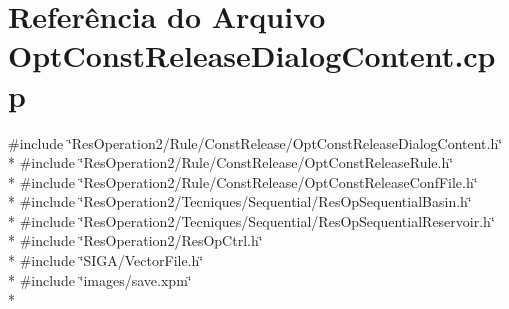 \section{Referência do Arquivo Opt\+Const\+Release\+Dialog\+Content.\+cpp}
\label{_opt_const_release_dialog_content_8cpp}
{\ttfamily \#include \char`\"{}Res\+Operation2/\+Rule/\+Const\+Release/\+Opt\+Const\+Release\+Dialog\+Content.\+h\char`\"{}}\\*
{\ttfamily \#include \char`\"{}Res\+Operation2/\+Rule/\+Const\+Release/\+Opt\+Const\+Release\+Rule.\+h\char`\"{}}\\*
{\ttfamily \#include \char`\"{}Res\+Operation2/\+Rule/\+Const\+Release/\+Opt\+Const\+Release\+Conf\+File.\+h\char`\"{}}\\*
{\ttfamily \#include \char`\"{}Res\+Operation2/\+Tecniques/\+Sequential/\+Res\+Op\+Sequential\+Basin.\+h\char`\"{}}\\*
{\ttfamily \#include \char`\"{}Res\+Operation2/\+Tecniques/\+Sequential/\+Res\+Op\+Sequential\+Reservoir.\+h\char`\"{}}\\*
{\ttfamily \#include \char`\"{}Res\+Operation2/\+Res\+Op\+Ctrl.\+h\char`\"{}}\\*
{\ttfamily \#include \char`\"{}S\+I\+G\+A/\+Vector\+File.\+h\char`\"{}}\\*
{\ttfamily \#include \char`\"{}images/save.\+xpm\char`\"{}}\\*
